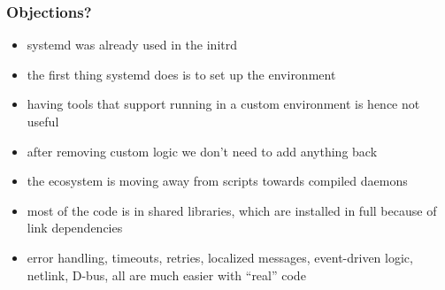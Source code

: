 \documentclass[]{beamer}
\newcommand\pp\pause
\begin{document}
\begin{frame}
  \frametitle{Objections?}


  \begin{itemize}
    \pp
    \item
      systemd was already used in the initrd
    \pp
    \item
      the first thing systemd does is to set up the environment
    \pp
    \item
      having tools that support running in a custom environment is hence not useful
    \pp
    \item
      after removing custom logic we don't need to add anything back
    \pp
    \item
      the ecosystem is moving away from scripts towards compiled daemons
    \pp
    \item
      most of the code is in shared libraries, which are installed in full because of link dependencies
    \pp
    \item
      error handling, timeouts, retries, localized messages, event-driven logic, netlink,
      D-bus, all are much easier with ``real'' code
  \end{itemize}
\end{frame}
\end{document}
